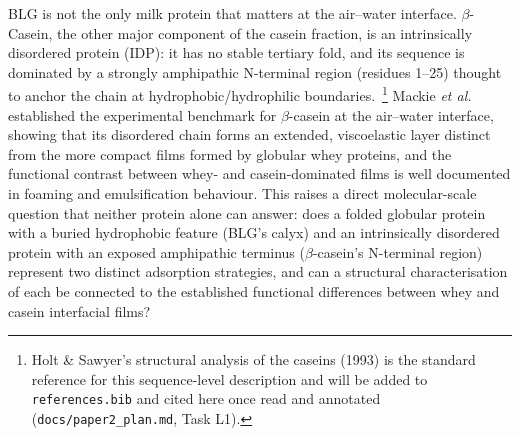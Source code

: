 \documentclass[11pt,a4paper]{article}
\begin{document}
BLG is not the only milk protein that matters at the air--water interface.
$\beta$-Casein, the other major component of the casein fraction, is an
intrinsically disordered protein (IDP): it has no stable tertiary fold,
and its sequence is dominated by a strongly amphipathic N-terminal region
(residues 1--25) thought to anchor the chain at hydrophobic/hydrophilic
boundaries\citep{Mackie1999}.~\footnote{Holt \& Sawyer's structural analysis
of the caseins (1993) is the standard reference for this sequence-level
description and will be added to \texttt{references.bib} and cited here
once read and annotated (\texttt{docs/paper2\_plan.md}, Task L1).} Mackie \textit{et al.} established
the experimental benchmark for $\beta$-casein at the air--water interface,
showing that its disordered chain forms an extended, viscoelastic layer
distinct from the more compact films formed by globular whey
proteins\citep{Mackie1999}, and the functional contrast between whey- and
casein-dominated films is well documented in foaming and emulsification
behaviour\citep{Dickinson1999,Foam4_2020}. This raises a direct molecular-scale
question that neither protein alone can answer: does a folded globular
protein with a buried hydrophobic feature (BLG's calyx) and an
intrinsically disordered protein with an exposed amphipathic terminus
($\beta$-casein's N-terminal region) represent two distinct adsorption
strategies, and can a structural characterisation of each be connected to
the established functional differences between whey and casein interfacial
films\citep{Gochev2019JPCB,Foam4_2020}?
\end{document}
